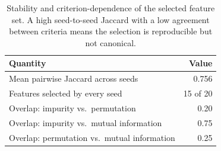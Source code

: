 \begin{table}[htbp]
\centering
\caption{Stability and criterion-dependence of the selected feature set. A high seed-to-seed Jaccard with a low agreement between criteria means the selection is reproducible but not canonical.}
\label{tab:featstab}
\footnotesize
\begin{tabular}{lr}
\hline
Quantity & Value \\
\hline
Mean pairwise Jaccard across seeds & 0.756 \\
Features selected by every seed & 15 of 20 \\
Overlap: impurity vs.\ permutation & 0.20 \\
Overlap: impurity vs.\ mutual information & 0.75 \\
Overlap: permutation vs.\ mutual information & 0.25 \\
\hline
\end{tabular}
\end{table}
